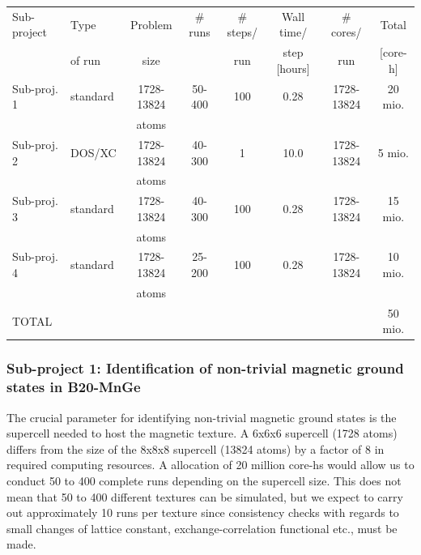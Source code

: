 \documentclass [a4paper, 12pt]{article}
\begin{document}
\begin{tabular}{llcccccc} \hline\hline
  Sub-project & 
  Type &
  Problem & 
  \# runs & 
  \# steps/ & 
  Wall time/ & 
  \# cores/ & 
  Total \\
  &
  of run &
  size  &
  &
  run &
  step [hours] &
  run &
  [core-h] \\
 \hline\hline
  Sub-proj. 1 & 
  standard &
  1728-13824 & 
  50-400 & 
  100 &
  0.28 &
  1728-13824 &
  20 mio. \\
     &
     &
    atoms & 
     & 
     &
     &
     &
     \\
  Sub-proj. 2 & 
  DOS/XC &
  1728-13824 & 
  40-300 & 
  1 &
  10.0 &
  1728-13824 &
  5 mio. \\
     &
     &
    atoms & 
     & 
     &
     &
     &
     \\
  Sub-proj. 3 & 
  standard &
  1728-13824 & 
  40-300 & 
  100 &
  0.28 &
  1728-13824 &
  15 mio. \\
     &
     &
    atoms & 
     & 
     &
     &
     &
     \\
  Sub-proj. 4 & 
  standard &
  1728-13824 & 
  25-200 & 
  100 &
  0.28 &
  1728-13824 &
  10 mio. \\
     &
     &
    atoms & 
     & 
     &
     &
     &
     \\



\hline\hline
TOTAL & & & & & & & 50 mio. \\
\end{tabular}
\bigskip


\subsubsection{Sub-project 1: Identification of non-trivial magnetic ground states in B20-MnGe}
The crucial parameter for identifying non-trivial magnetic ground states is the
supercell needed to host the magnetic texture.
A 6x6x6 supercell (1728 atoms) differs from the size of the 8x8x8 supercell (13824 atoms)
by a factor of 8 in required computing resources. A allocation of 20 million core-hs would allow
us to conduct 50 to 400 complete runs depending on the supercell size.
This does not mean that 50 to 400 different textures can be simulated, but
we expect to carry out approximately 10 runs per texture since consistency checks with regards to 
small changes of lattice constant, exchange-correlation functional etc., must be made.
\end{document}

